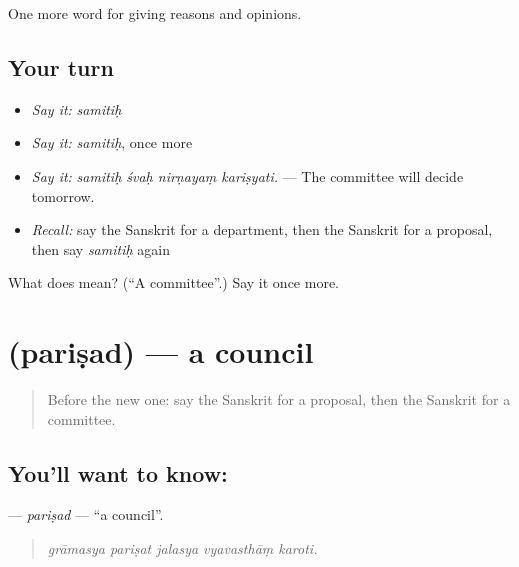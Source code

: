 \begin{grammarlens}[title={What you've built}]
One more word for giving reasons and opinions.
\end{grammarlens}

\subsection*{Your turn}
\begin{itemize}
\raggedright
  \item \emph{Say it:} \emph{samitiḥ}
  \item \emph{Say it:} \emph{samitiḥ}, once more
  \item \emph{Say it:} \emph{samitiḥ śvaḥ nirṇayaṃ kariṣyati.} — The committee will decide tomorrow.
  \item \emph{Recall:} say the Sanskrit for a department, then the Sanskrit for a proposal, then say \emph{samitiḥ} again
\end{itemize}

\begin{tcolorbox}[breakable,colback=teal!4,colframe=teal!35!black,title={Before you move on}]
What does  mean? (\textquotedblleft{}A committee\textquotedblright{}.) Say it once more.
\end{tcolorbox}
\section[\texorpdfstring{\sk{परिषद्} (pariṣad)}{परिषद् (pariṣad)}]{ (pariṣad) — a council}

\label{lesson:SA-C357-parisad}



\begin{quote}
Before the new one: say the Sanskrit for a proposal, then the Sanskrit for a committee.
\end{quote}

\subsection*{You'll want to know: }
\textbf{} — \emph{pariṣad} — \textquotedblleft{}a council\textquotedblright{}.

\begin{quote}
    
\end{quote}

\begin{quote}
\emph{grāmasya pariṣat jalasya vyavasthāṃ karoti.}
\end{quote}

